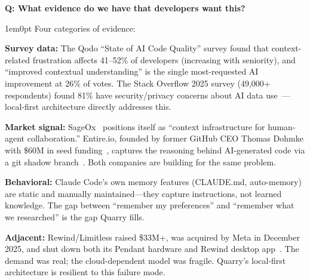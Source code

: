 \documentclass[11pt,letterpaper]{article}
\newcounter{faqnum}
\newenvironment{faqpair}[1]{%
  \needspace{4\baselineskip}%
  \vspace{0.5em}%
  \refstepcounter{faqnum}%
  \noindent\textbf{\color{SectionBlue}Q\thefaqnum: #1}\par\nopagebreak[4]%
  \vspace{0.2em}%
  \begin{adjustwidth}{1em}{0pt}%
  \setlength{\parindent}{0pt}%
}{%
  \end{adjustwidth}%
  \vspace{0.5em}%
}
\begin{document}
\begin{faqpair}{What evidence do we have that developers want this?}\label{faq:evidence}
  Four categories of evidence:

  \textbf{Survey data:} The Qodo ``State of AI Code Quality'' survey found
  that context-related frustration affects 41--52\% of developers (increasing
  with seniority), and ``improved contextual understanding'' is the single
  most-requested AI improvement at 26\% of votes. The Stack Overflow 2025
  survey (49{,}000+ respondents) found 81\% have security/privacy concerns
  about AI data use~\cite{stackoverflow2025survey}---local-first architecture
  directly addresses this.

  \textbf{Market signal:} SageOx~\cite{sageox2026} positions itself as ``context
  infrastructure for human-agent collaboration.'' Entire.io, founded by former
  GitHub CEO Thomas Dohmke with \$60M in seed
  funding~\cite{techcrunch2026entirefunding}, captures the reasoning behind
  AI-generated code via a git shadow branch~\cite{entireio2026github}. Both
  companies are building for the same problem.

  \textbf{Behavioral:} Claude Code's own memory features (CLAUDE.md,
  auto-memory) are static and manually maintained---they capture instructions,
  not learned knowledge. The gap between ``remember my preferences'' and
  ``remember what we researched'' is the gap Quarry fills.

  \textbf{Adjacent:} Rewind/Limitless raised \$33M+, was acquired by Meta in
  December 2025, and shut down both its Pendant hardware and Rewind desktop
  app~\cite{techcrunch2025limitless,9to5mac2025rewindshutdown}. The demand was
  real; the cloud-dependent model was fragile. Quarry's local-first
  architecture is resilient to this failure mode.
\end{faqpair}
\end{document}
